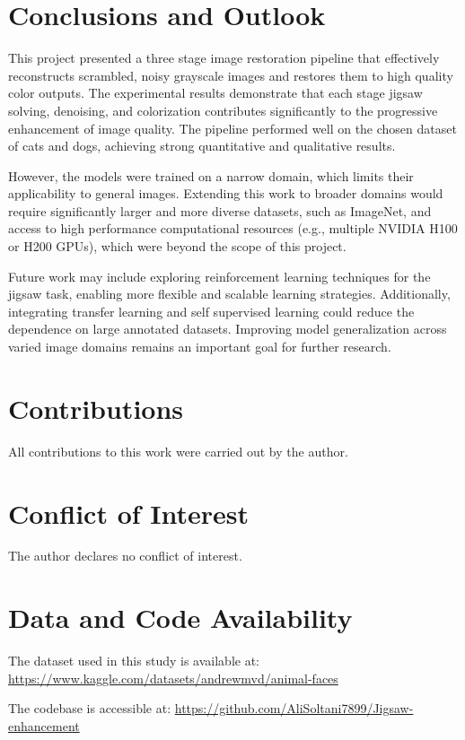 \documentclass[%
 reprint,
 amsmath,amssymb,
 aps,
]{revtex4-2}
\begin{document}
\section{\label{sec:conclusion}Conclusions and Outlook} %
This project presented a three stage image restoration pipeline that effectively reconstructs scrambled, noisy grayscale images and restores them to high quality color outputs. The experimental results demonstrate that each stage jigsaw solving, denoising, and colorization contributes significantly to the progressive enhancement of image quality. The pipeline performed well on the chosen dataset of cats and dogs, achieving strong quantitative and qualitative results.

However, the models were trained on a narrow domain, which limits their applicability to general images. Extending this work to broader domains would require significantly larger and more diverse datasets, such as ImageNet, and access to high performance computational resources (e.g., multiple NVIDIA H100 or H200 GPUs), which were beyond the scope of this project.

Future work may include exploring reinforcement learning techniques for the jigsaw task, enabling more flexible and scalable learning strategies. Additionally, integrating transfer learning and self supervised learning could reduce the dependence on large annotated datasets. Improving model generalization across varied image domains remains an important goal for further research.

\section{\label{sec:Contribution}Contributions} %
All contributions to this work were carried out by the author.

\section{\label{sec:COI}Conflict of Interest} %
The author declares no conflict of interest.

\section{\label{sec:datacode}Data and Code Availability} %
The dataset used in this study is available at:  
\url{https://www.kaggle.com/datasets/andrewmvd/animal-faces}

The codebase is accessible at:  
\url{https://github.com/AliSoltani7899/Jigsaw-enhancement}


\printbibliography
\end{document}
